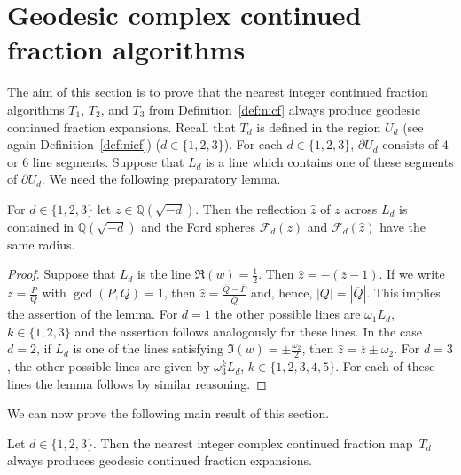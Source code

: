 \documentclass[graybox]{svmult}
\begin{document}
\section{Geodesic complex continued fraction algorithms}  

The aim of this section is to prove that the nearest integer continued fraction algorithms $T_1$, $T_2$, and $T_3$ from Definition~\ref{def:nicf} always produce geodesic continued fraction expansions. Recall that $T_d$ is defined in the region $U_d$ (see again Definition~\ref{def:nicf}) ($d\in \{1,2,3\}$).
For each $d \in \{1, 2, 3\}$, $\partial U_{d}$ consists of $4$ or $6$ line segments.  Suppose that $L_{d}$ is a line which contains one of these segments of $\partial U_{d}$.  We need  the following preparatory lemma.  

\begin{lemma}\label{lem:prepgeoalg}
For $d\in \{1,2,3\}$ let $z \in \mathbb Q(\sqrt{-d})$.  Then the reflection $\hat{z}$ of $z$ across 
$L_{d}$ is contained in $\mathbb Q(\sqrt{-d})$ and the Ford spheres $\mathcal F_d(z)$ 
and $\mathcal F_d(\hat{z})$ have the same radius.  
\end{lemma} 
\begin{proof} 
Suppose that $L_{d}$ is the line $\Re(w) = \tfrac{1}{2}$.  Then $\hat{z} = 
-(\overline{z}-1)$. If we write $z = \tfrac{P}{Q}$ with $\gcd(P,Q)=1$, then $\hat{z} = \tfrac{\overline{Q} - 
\overline{P}}{\overline{Q}}$ and, hence, $|Q| = |\overline{Q}|$. This implies the assertion of the 
lemma.  For $d=1$ the other possible lines are $\omega_1 L_{d}$, $k \in \{1, 2, 3\}$ and the assertion follows analogously for these lines. In the case $d=2$, if $L_d$ is one of the lines satisfying $\Im(w)=\pm \frac{\omega_2}{2}$, then $\hat z= \overline{z}\pm \omega_2$. For $d=3$, the other possible lines are given by $\omega_{3}^{k} L_{d}$, $k\in\{1, 2, 3, 4, 5\}$. For each of these lines the lemma follows by similar reasoning.   
\end{proof}

We can now prove the following main result of this section.

\begin{theorem}
Let $d \in \{1, 2, 3\}$. Then the nearest integer complex continued fraction map~$T_d$ always produces geodesic continued fraction expansions. 
\end{theorem}
\end{document}
